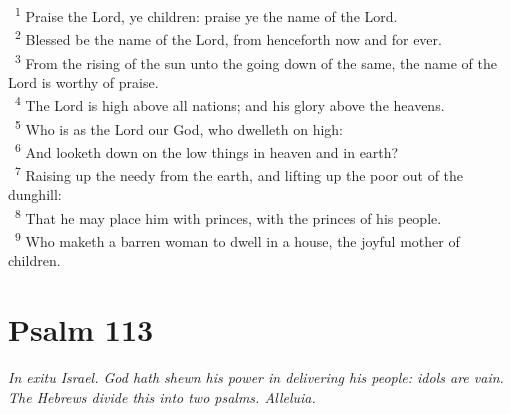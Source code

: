 \documentclass[a5paper,12pt]{article}
\begin{document}
\begin{multicols*}{2}
~\textsuperscript{1} Praise the Lord, ye children: praise ye the name of the Lord.\\
~\textsuperscript{2} Blessed be the name of the Lord, from henceforth now and for ever.\\
~\textsuperscript{3} From the rising of the sun unto the going down of the same, the name of the Lord is worthy of praise.\\
~\textsuperscript{4} The Lord is high above all nations; and his glory above the heavens.\\
~\textsuperscript{5} Who is as the Lord our God, who dwelleth on high:\\
~\textsuperscript{6} And looketh down on the low things in heaven and in earth?\\
~\textsuperscript{7} Raising up the needy from the earth, and lifting up the poor out of the dunghill:\\
~\textsuperscript{8} That he may place him with princes, with the princes of his people.\\
~\textsuperscript{9} Who maketh a barren woman to dwell in a house, the joyful mother of children.\\

\section{Psalm 113}
\label{sec:orgb0e937d}
\emph{In exitu Israel. God hath shewn his power in delivering his people: idols are vain. The Hebrews divide this into two psalms. Alleluia.}\\


\end{multicols*}
\end{document}
